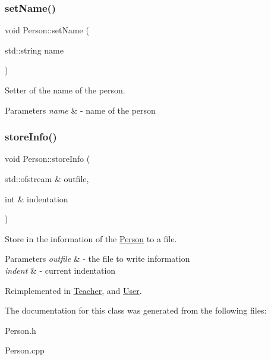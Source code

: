 \subsubsection{\texorpdfstring{set\+Name()}{setName()}}
{\footnotesize\ttfamily void Person\+::set\+Name (\begin{DoxyParamCaption}\item[{std\+::string}]{name }\end{DoxyParamCaption})}



Setter of the name of the person. 


\begin{DoxyParams}{Parameters}
{\em name} & -\/ name of the person \\
\hline
\end{DoxyParams}
\mbox{\label{class_person_a80f87df3f644706c2ad8fc8b800fdd95}} 
\subsubsection{\texorpdfstring{store\+Info()}{storeInfo()}}
{\footnotesize\ttfamily void Person\+::store\+Info (\begin{DoxyParamCaption}\item[{std\+::ofstream \&}]{outfile,  }\item[{int \&}]{indentation }\end{DoxyParamCaption})\hspace{0.3cm}{\ttfamily [virtual]}}



Store in the information of the \mbox{\hyperlink{class_person}{Person}} to a file. 


\begin{DoxyParams}{Parameters}
{\em outfile} & -\/ the file to write information \\
\hline
{\em indent} & -\/ current indentation \\
\hline
\end{DoxyParams}


Reimplemented in \mbox{\hyperlink{class_teacher_a2ece0d60fa7ec4aaf93333aa0be0d25f}{Teacher}}, and \mbox{\hyperlink{class_user_aac5ff0f6899f3ce56d1b2d12ed557c79}{User}}.



The documentation for this class was generated from the following files\+:\begin{DoxyCompactItemize}
\item 
Person.\+h\item 
Person.\+cpp\end{DoxyCompactItemize}
